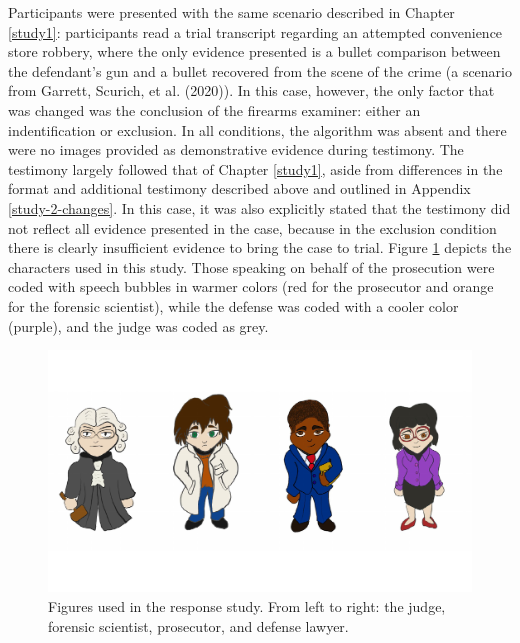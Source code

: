 \documentclass[print]{nuthesis}
\begin{document}
Participants were presented with the same scenario described in Chapter \ref{study1}: participants read a trial transcript regarding an attempted convenience store robbery, where the only evidence presented is a bullet comparison between the defendant's gun and a bullet recovered from the scene of the crime (a scenario from Garrett, Scurich, et al. (2020)).
In this case, however, the only factor that was changed was the conclusion of the firearms examiner: either an indentification or exclusion.
In all conditions, the algorithm was absent and there were no images provided as demonstrative evidence during testimony.
The testimony largely followed that of Chapter \ref{study1}, aside from differences in the format and additional testimony described above and outlined in Appendix \ref{study-2-changes}.
In this case, it was also explicitly stated that the testimony did not reflect all evidence presented in the case, because in the exclusion condition there is clearly insufficient evidence to bring the case to trial.
Figure \ref{fig:responsefigures} depicts the characters used in this study.
Those speaking on behalf of the prosecution were coded with speech bubbles in warmer colors (red for the prosecutor and orange for the forensic scientist), while the defense was coded with a cooler color (purple), and the judge was coded as grey.

\begin{figure}

{\centering \includegraphics[width=\linewidth]{thesis_files/figure-latex/responsefigures-1} 

}

\caption{Figures used in the response study. From left to right: the judge, forensic scientist, prosecutor, and defense lawyer.}\label{fig:responsefigures}
\end{figure}
\end{document}
